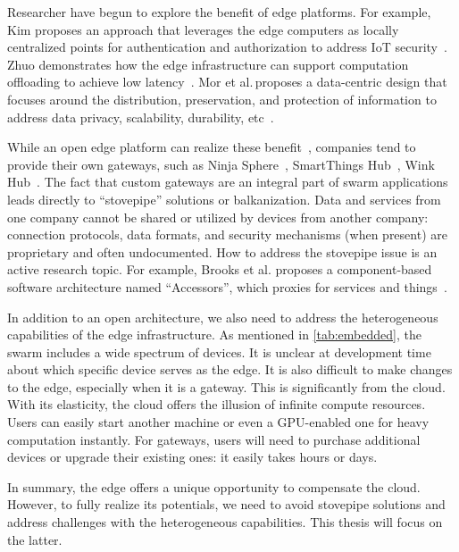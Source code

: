 Researcher have begun to explore the benefit of edge platforms. For example, Kim
proposes an approach that leverages the edge computers as locally centralized
points for authentication and authorization to address IoT
security~\cite{kim2017securing}. Zhuo demonstrates how the edge infrastructure
can support computation offloading to achieve low
latency~\cite{chen2018application}. Mor et al.\,proposes a data-centric design
that focuses around the distribution, preservation, and protection of
information to address data privacy, scalability, durability,
etc~\cite{mor2016toward}.

While an open edge platform can realize these
benefit~\cite{zachariah1001internet}, companies tend to provide their own
gateways, such as Ninja Sphere~\cite{ninja}, SmartThings Hub~\cite{smartthings},
Wink Hub~\cite{wink}. The fact that custom gateways are an integral part of
swarm applications leads directly to ``stovepipe'' solutions or
balkanization. Data and services from one company cannot be shared or utilized
by devices from another company: connection protocols, data formats, and
security mechanisms (when present) are proprietary and often undocumented. How
to address the stovepipe issue is an active research topic. For example, Brooks
et al. proposes a component-based software architecture named ``Accessors'',
which proxies for services and things~\cite{brooks2018component}.

In addition to an open architecture, we also need to address the heterogeneous
capabilities of the edge infrastructure. As mentioned in \autoref{tab:embedded},
the swarm includes a wide spectrum of devices. It is unclear at development time
about which specific device serves as the edge. It is also difficult to make
changes to the edge, especially when it is a gateway. This is significantly from
the cloud. With its elasticity, the cloud offers the illusion of infinite
compute resources. Users can easily start another machine or even a GPU-enabled
one for heavy computation instantly. For gateways, users will need to purchase
additional devices or upgrade their existing ones: it easily takes hours or
days.

In summary, the edge offers a unique opportunity to compensate the
cloud. However, to fully realize its potentials, we need to avoid stovepipe
solutions and address challenges with the heterogeneous capabilities. This
thesis will focus on the latter.


